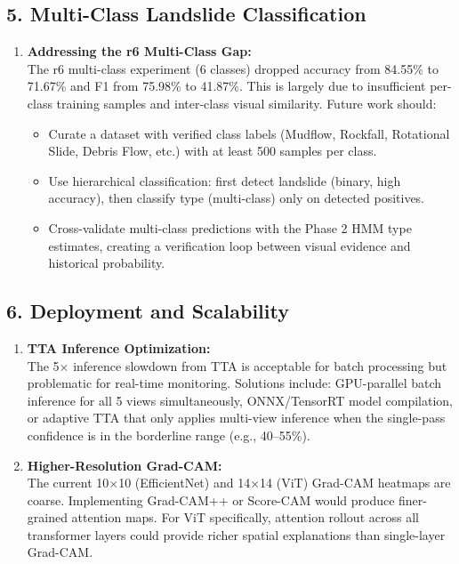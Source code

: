 \documentclass[11pt]{article}
\begin{document}
\subsection{5. Multi-Class Landslide Classification}
\begin{enumerate}
    \item \textbf{Addressing the r6 Multi-Class Gap:}\\
          The r6 multi-class experiment (6 classes) dropped accuracy from 84.55\% to 71.67\% and F1 from 75.98\% to 41.87\%. This is largely due to insufficient per-class training samples and inter-class visual similarity. Future work should:
          \begin{itemize}
              \item Curate a dataset with verified class labels (Mudflow, Rockfall, Rotational Slide, Debris Flow, etc.) with at least 500 samples per class.
              \item Use hierarchical classification: first detect landslide (binary, high accuracy), then classify type (multi-class) only on detected positives.
              \item Cross-validate multi-class predictions with the Phase 2 HMM type estimates, creating a verification loop between visual evidence and historical probability.
          \end{itemize}
\end{enumerate}

\subsection{6. Deployment and Scalability}
\begin{enumerate}
    \item \textbf{TTA Inference Optimization:}\\
          The 5$\times$ inference slowdown from TTA is acceptable for batch processing but problematic for real-time monitoring. Solutions include: GPU-parallel batch inference for all 5 views simultaneously, ONNX/TensorRT model compilation, or adaptive TTA that only applies multi-view inference when the single-pass confidence is in the borderline range (e.g., 40--55\%).
    \item \textbf{Higher-Resolution Grad-CAM:}\\
          The current 10$\times$10 (EfficientNet) and 14$\times$14 (ViT) Grad-CAM heatmaps are coarse. Implementing Grad-CAM++ or Score-CAM would produce finer-grained attention maps. For ViT specifically, attention rollout across all transformer layers could provide richer spatial explanations than single-layer Grad-CAM.
\end{enumerate}
\end{document}
